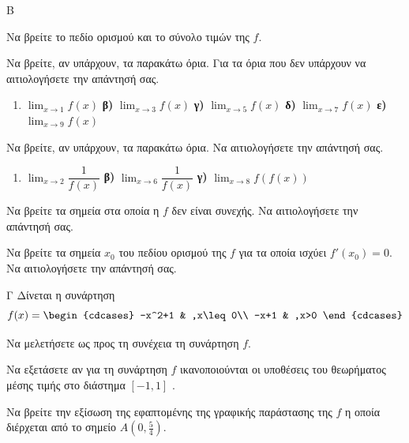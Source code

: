 \begin{thema}{Β}
\begin{center}
\end{center}
\vspace{4pt}

\begin{erwthma}
    \item Να βρείτε το πεδίο ορισμού και το σύνολο τιμών της $f$. 
    \item Να βρείτε, αν υπάρχουν, τα παρακάτω όρια. Για τα όρια που δεν υπάρχουν να αιτιολογήσετε την απάντησή σας.
    \begin{enumerate}[label=\alph*)]
        \item $\displaystyle\lim_{x \to 1} f(x)$ \quad
        \textbf{β)} $\displaystyle\lim_{x \to 3} f(x)$ \quad
        \textbf{γ)} $\displaystyle\lim_{x \to 5} f(x)$ \quad
        \textbf{δ)} $\displaystyle\lim_{x \to 7} f(x)$ \quad
        \textbf{ε)} $\displaystyle\lim_{x \to 9} f(x)$
    \end{enumerate}
    \item Να βρείτε, αν υπάρχουν, τα παρακάτω όρια. Να αιτιολογήσετε την απάντησή σας.
    \begin{enumerate}[label=\alph*)]
        \item $\displaystyle\lim_{x \to 2} \dfrac{1}{f(x)}$ \quad
        \textbf{β)} $\displaystyle\lim_{x \to 6} \dfrac{1}{f(x)}$ \quad
        \textbf{γ)} $\displaystyle\lim_{x \to 8} f(f(x))$
    \end{enumerate}
    \item Να βρείτε τα σημεία στα οποία η $f$ δεν είναι συνεχής. Να αιτιολογήσετε την απάντησή σας. 
    \item Να βρείτε τα σημεία $x_0$ του πεδίου ορισμού της $f$ για τα οποία ισχύει $f'(x_0) = 0$. Να αιτιολογήσετε την απάντησή σας. 
\end{erwthma}
\end{thema}

\begin{thema}{Γ}
Δίνεται η συνάρτηση
\[f(x)=\begin{cdcases}
-x^2+1 & ,x\leq 0\\ -x+1 & ,x>0
\end{cdcases}\]
\begin{erwthma}
\item  Να μελετήσετε ως προς τη συνέχεια τη συνάρτηση $f$.
\item 
Να εξετάσετε αν για τη συνάρτηση $f$ ικανοποιούνται οι υποθέσεις του θεωρήματος
μέσης τιμής στο διάστημα $[-1, 1]$ .
\item 
Να βρείτε την εξίσωση της εφαπτομένης της γραφικής παράστασης της $f$ η οποία διέρχεται από το σημείο $A\left(0,\frac{5}{4}\right)$.
\end{erwthma}
\end{thema}


